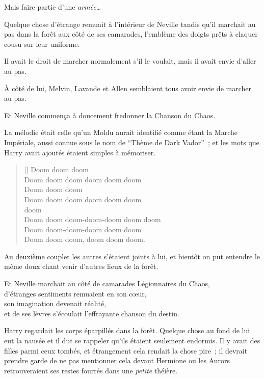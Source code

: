Mais faire partie d'une \emph{armée}…

Quelque chose d'étrange remuait à l'intérieur de Neville tandis qu'il marchait au pas dans la forêt aux côté de ses camarades, l'emblème des doigts prêts à claquer cousu sur leur uniforme.

Il avait le droit de marcher normalement s'il le voulait, mais il avait envie d'aller au pas.

À côté de lui, Melvin, Lavande et Allen semblaient tous avoir envie de marcher au pas.

Et Neville commença à doucement fredonner la Chanson du Chaos.

La mélodie était celle qu'un Moldu aurait identifié comme étant la Marche Impériale, aussi connue sous le nom de “Thème de Dark Vador”~; et les mots que Harry avait ajoutés étaient simples à mémoriser.
\baselineskip\settowidth{\versewidth}{Doom doom doom-doom-doom doom doom} \begin{verse}[\versewidth] Doom doom doom\\ Doom doom doom doom doom doom\\ Doom doom doom\\ Doom doom doom doom doom doom\\  doom \\ Doom doom doom-doom-doom doom doom\\ Doom doom-doom-doom doom doom\\ Doom doom doom, doom doom doom. \end{verse}\baselineskip

Au deuxième couplet les autres s'étaient joints à lui, et bientôt on put entendre le même doux chant venir d'autres lieux de la forêt.

Et Neville marchait au côté de camarades Légionnaires du Chaos,\\ d'étranges sentiments remuaient en son cœur,\\ son imagination devenait réalité,\\ et de ses lèvres s'écoulait l'effrayante chanson du destin.

\later

Harry regardait les corps éparpillés dans la forêt. Quelque chose au fond de lui eut la nausée et il dut se rappeler qu'ils étaient seulement endormis. Il y avait des filles parmi ceux tombés, et étrangement cela rendait la chose pire~; il devrait prendre garde de ne pas mentionner cela devant Hermione ou les Aurors retrouveraient ses restes fourrés dans une \emph{petite} théière.

